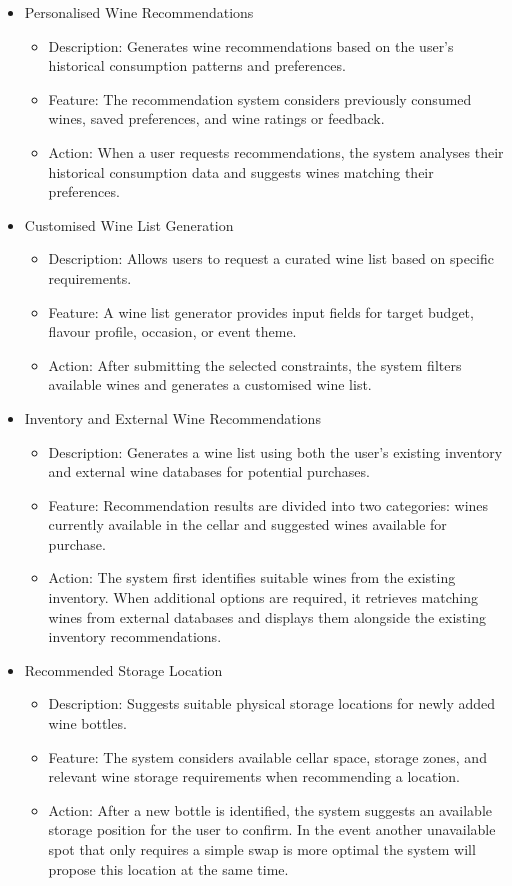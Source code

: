 \documentclass[conference]{IEEEtran}
\begin{document}
\begin{itemize}
    \item Personalised Wine Recommendations
    \begin{itemize}
        \item Description: Generates wine recommendations based on the user's historical consumption patterns and preferences.
        \item Feature: The recommendation system considers previously consumed wines, saved preferences, and wine ratings or feedback.
        \item Action: When a user requests recommendations, the system analyses their historical consumption data and suggests wines matching their preferences.
    \end{itemize}

    \item Customised Wine List Generation
    \begin{itemize}
        \item Description: Allows users to request a curated wine list based on specific requirements.
        \item Feature: A wine list generator provides input fields for target budget, flavour profile, occasion, or event theme.
        \item Action: After submitting the selected constraints, the system filters available wines and generates a customised wine list.
    \end{itemize}

    \item Inventory and External Wine Recommendations
    \begin{itemize}
        \item Description: Generates a wine list using both the user's existing inventory and external wine databases for potential purchases.
        \item Feature: Recommendation results are divided into two categories: wines currently available in the cellar and suggested wines available for purchase.
        \item Action: The system first identifies suitable wines from the existing inventory. When additional options are required, it retrieves matching wines from external databases and displays them alongside the existing inventory recommendations.
    \end{itemize}

    \item Recommended Storage Location
    \begin{itemize}
        \item Description: Suggests suitable physical storage locations for newly added wine bottles.
        \item Feature: The system considers available cellar space, storage zones, and relevant wine storage requirements when recommending a location.
        \item Action: After a new bottle is identified, the system suggests an available storage position for the user to confirm. In the event another unavailable spot that only requires a simple swap is more optimal the system will propose this location at the same time.
    \end{itemize}


\end{itemize}
\end{document}

